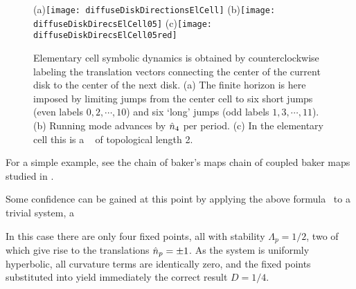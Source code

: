 \begin{figure}
  \begin{center}
    (a)\texttt{[image: diffuseDiskDirectionsElCell]}
    (b)\texttt{[image: diffuseDiskDirecsElCell05]}
    (c)\texttt{[image: diffuseDiskDirecsElCell05red]}
  \end{center}
  \caption{\label{fig-diskDirectionsElCell}
  Elementary cell symbolic dynamics is obtained by counterclockwise
  labeling the translation vectors connecting the center of the current
  disk to the center of  the next disk. (a) The finite horizon is here
  imposed by limiting jumps from  the center cell to six short jumps
  (even labels $0, 2,\cdots,10$) and six `long' jumps (odd labels $1,
  3,\cdots,11$). (b) Running mode   advances by $\hat{n}_4$ per
  period. (c) In the elementary cell this is  a \po\  of
  topological length 2.
  }
\end{figure}


For a simple example, see the chain of baker's maps chain of coupled
baker maps studied in .

Some confidence can be gained at this point by applying the above
formula~ to a trivial system, a

In this case there are only four fixed points, all with
stability $\Lambda_p=1/2$, two of
which give rise to the translations $\hat{n}_{p}=\pm 1$.
As the system is
uniformly hyperbolic, all curvature terms are identically zero,
and the fixed points substituted into  yield
immediately the correct result $D=1/4$.
